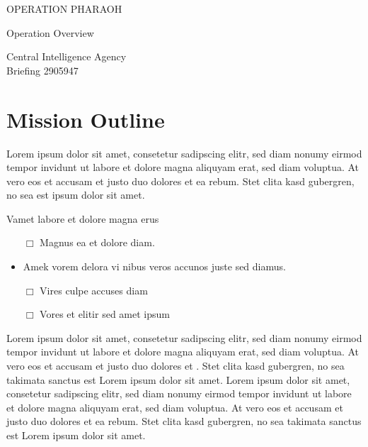 \documentclass[12pt]{report}
\newcommand{\sidewaystext}[1]{\marginnote{\rotatebox{90}{\large#1}}}
\newcommand{\operation}{\uppercase{operation pharaoh}}
\newcommand{\restriction}{\uppercase{classified}}
\newcommand{\identifier}{Briefing 2905947}
\begin{document}
\begin{titlepage}
\begin{center}
\vspace*{1cm}

\begin{Huge}
  \operation
\end{Huge}

\vspace{0.5cm}

\begin{Large}
  Operation Overview
\end{Large}

\vfill

\begin{large}
Central Intelligence Agency\\
\identifier
\end{large}

\vspace{0.8cm}
\end{center}
\end{titlepage}

\section*{Mission Outline}%


Lorem ipsum dolor sit amet, consetetur sadipscing elitr, sed diam nonumy eirmod tempor invidunt ut labore et dolore magna aliquyam erat, sed diam voluptua. At vero eos et accusam et justo duo dolores et ea rebum. Stet clita kasd gubergren, no sea  est  ipsum dolor sit amet.

Vamet labore et dolore magna erus

\begin{itemize}[label={$\CheckedBox$}]
  \item[$\Box$] Magnus ea et dolore diam.
  \item Amek vorem delora vi nibus veros accunos juste sed diamus.
  \item[$\Box$] Vires culpe accuses diam
  \item[$\Box$] Vores et elitir sed amet ipsum
\end{itemize}


Lorem ipsum dolor sit amet, consetetur sadipscing elitr, sed diam nonumy eirmod tempor invidunt ut labore et dolore magna aliquyam erat, sed diam voluptua. At vero eos et accusam et justo duo dolores et . Stet clita kasd gubergren, no sea takimata sanctus est Lorem ipsum dolor sit amet. Lorem ipsum dolor sit amet, consetetur sadipscing elitr, sed diam nonumy eirmod tempor invidunt ut labore et dolore magna aliquyam erat, sed diam voluptua. At vero eos et accusam et justo duo dolores et ea rebum. Stet clita kasd gubergren, no sea takimata sanctus est Lorem ipsum dolor sit amet.
\end{document}
